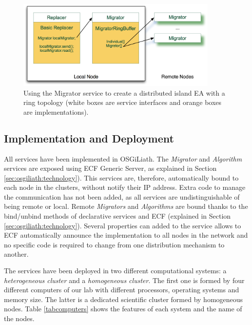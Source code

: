 \begin{figure}
\centering
\includegraphics[width=10cm]{gfx/osgiliath/migrator.png}


\caption{Using the Migrator service to create a distributed island EA with a ring topology (white boxes are service interfaces and orange boxes are implementations).}
\label{MIGRATOR}
\end{figure}


\subsection{Implementation and Deployment}

All services have been implemented in OSGiLiath. The {\em Migrator} and {\em Algorithm} services are exposed using ECF Generic Server, as explained in Section \ref{sec:osgiliath:technology}). This services are, therefore, automatically bound to each node in the clusters, without notify their IP address. Extra code to manage the communication has not been added, as all services are undistinguishable of being remote or local. Remote {\em Migrators} and {\em Algorithms} are bound thanks to the bind/unbind methods of declarative services and ECF (explained in Section \ref{sec:osgiliath:technology}). Several properties can added to the service allows to ECF automatically announce the implementation to all nodes in the network and no specific code is required to change from one distribution mechanism to another.

The services have been deployed in two different computational systems: a {\em
  heterogeneous cluster} %
and a {\em homogeneous cluster}. The first
one is formed by four different computers of our lab with different
processors, operating systems and memory size. The latter is a
dedicated scientific cluster formed by homogeneous nodes. Table
\ref{tabcomputers} shows the features of each system and the name of
the nodes. %

